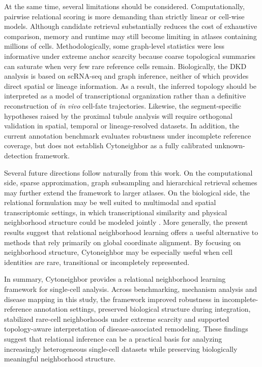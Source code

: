 \documentclass[11pt]{article}
\begin{document}
At the same time, several limitations should be considered. Computationally, pairwise relational scoring is more demanding than strictly linear or cell-wise models. Although candidate retrieval substantially reduces the cost of exhaustive comparison, memory and runtime may still become limiting in atlases containing millions of cells. Methodologically, some graph-level statistics were less informative under extreme anchor scarcity because coarse topological summaries can saturate when very few rare reference cells remain. Biologically, the DKD analysis is based on scRNA-seq and graph inference, neither of which provides direct spatial or lineage information. As a result, the inferred topology should be interpreted as a model of transcriptional organization rather than a definitive reconstruction of \textit{in vivo} cell-fate trajectories. Likewise, the segment-specific hypotheses raised by the proximal tubule analysis will require orthogonal validation in spatial, temporal or lineage-resolved datasets. In addition, the current annotation benchmark evaluates robustness under incomplete reference coverage, but does not establish Cytoneighbor as a fully calibrated unknown-detection framework.

Several future directions follow naturally from this work. On the computational side, sparse approximation, graph subsampling and hierarchical retrieval schemes may further extend the framework to larger atlases. On the biological side, the relational formulation may be well suited to multimodal and spatial transcriptomic settings, in which transcriptional similarity and physical neighborhood structure could be modeled jointly \cite{Heumos2023BestPractices,Hao2021Multimodal,Lake2023KidneyAtlas}. More generally, the present results suggest that relational neighborhood learning offers a useful alternative to methods that rely primarily on global coordinate alignment. By focusing on neighborhood structure, Cytoneighbor may be especially useful when cell identities are rare, transitional or incompletely represented.

In summary, Cytoneighbor provides a relational neighborhood learning framework for single-cell analysis. Across benchmarking, mechanism analysis and disease mapping in this study, the framework improved robustness in incomplete-reference annotation settings, preserved biological structure during integration, stabilized rare-cell neighborhoods under extreme scarcity and supported topology-aware interpretation of disease-associated remodeling. These findings suggest that relational inference can be a practical basis for analyzing increasingly heterogeneous single-cell datasets while preserving biologically meaningful neighborhood structure.
\end{document}
